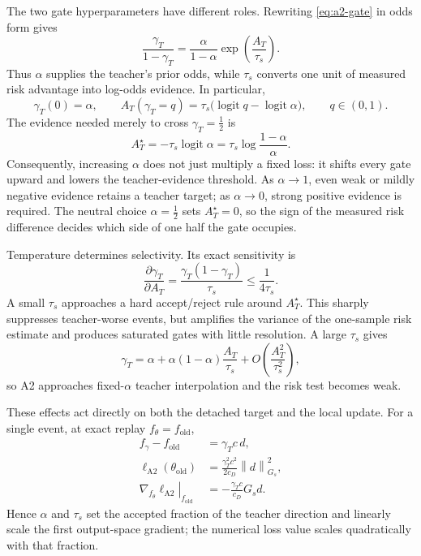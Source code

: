 \documentclass[11pt,a4paper]{article}
\newcommand{\norm}[1]{\left\lVert #1 \right\rVert}
\DeclareMathOperator{\logit}{logit}
\theoremstyle{plain}
\theoremstyle{definition}
\begin{document}
The two gate hyperparameters have different roles.  Rewriting \eqref{eq:a2-gate} in odds form gives
\begin{equation}
\frac{\gamma_T}{1-\gamma_T}
=
\frac{\alpha}{1-\alpha}
\exp\!\left(\frac{A_T}{\tau_s}\right).
\label{eq:a2-gate-odds}
\end{equation}
Thus $\alpha$ supplies the teacher's prior odds, while $\tau_s$ converts one unit of measured risk
advantage into log-odds evidence.  In particular,
\begin{equation}
\gamma_T(0)=\alpha,
\qquad
A_T(\gamma_T=q)
=
\tau_s\bigl(\logit q-\logit\alpha\bigr),
\qquad q\in(0,1).
\label{eq:a2-gate-threshold}
\end{equation}
The evidence needed merely to cross $\gamma_T=\tfrac12$ is
\begin{equation}
A_T^\star=-\tau_s\logit\alpha
=
\tau_s\log\frac{1-\alpha}{\alpha}.
\label{eq:a2-indifference-threshold}
\end{equation}
Consequently, increasing $\alpha$ does not just multiply a fixed loss: it shifts every gate upward
and lowers the teacher-evidence threshold.  As $\alpha\to1$, even weak or mildly negative evidence
retains a teacher target; as $\alpha\to0$, strong positive evidence is required.  The neutral choice
$\alpha=\tfrac12$ sets $A_T^\star=0$, so the sign of the measured risk difference decides which
side of one half the gate occupies.

Temperature determines selectivity.  Its exact sensitivity is
\begin{equation}
\frac{\partial\gamma_T}{\partial A_T}
=
\frac{\gamma_T(1-\gamma_T)}{\tau_s}
\le \frac{1}{4\tau_s}.
\label{eq:a2-gate-sensitivity}
\end{equation}
A small $\tau_s$ approaches a hard accept/reject rule around $A_T^\star$.  This sharply suppresses
teacher-worse events, but amplifies the variance of the one-sample risk estimate and produces
saturated gates with little resolution.  A large $\tau_s$ gives
\begin{equation}
\gamma_T
=
\alpha+\alpha(1-\alpha)\frac{A_T}{\tau_s}
+O\!\left(\frac{A_T^2}{\tau_s^2}\right),
\label{eq:a2-large-temperature}
\end{equation}
so A2 approaches fixed-$\alpha$ teacher interpolation and the risk test becomes weak.

These effects act directly on both the detached target and the local update.  For a single event,
at exact replay $f_\theta=f_{\mathrm{old}}$,
\begin{align}
f_\gamma-f_{\mathrm{old}}
&=\gamma_Tc\,d,\\
\ell_{\mathrm{A2}}(\theta_{\mathrm{old}})
&=\frac{\gamma_T^2c^2}{2c_D}\norm{d}_{G_s}^2,\\
\left.\nabla_{f_\theta}\ell_{\mathrm{A2}}\right|_{f_{\mathrm{old}}}
&=-\frac{\gamma_Tc}{c_D}G_s d.
\label{eq:a2-hparam-local-effect}
\end{align}
Hence $\alpha$ and $\tau_s$ set the accepted fraction of the teacher direction and linearly scale
the first output-space gradient; the numerical loss value scales quadratically with that fraction.
\end{document}
